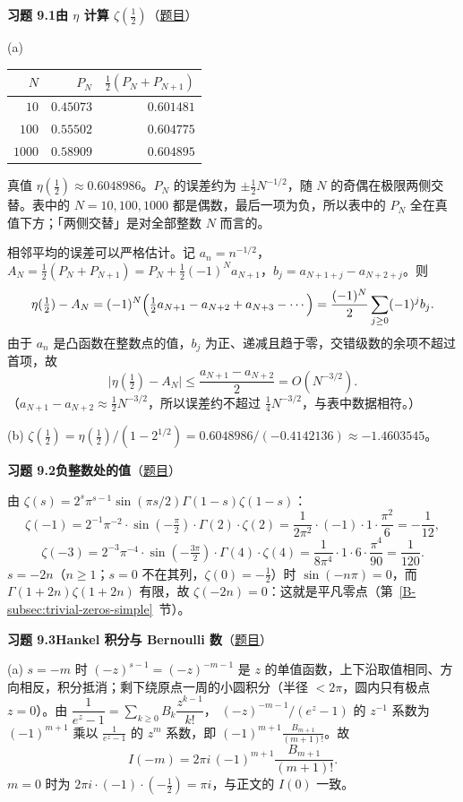 \documentclass[11pt,a4paper]{article}
\newcommand{\bref}[1]{\ref*{B-#1}}
\newcommand{\Sol}[2]{%
  \par\addvspace{1.2em}\noindent
  \hypertarget{s:#1}{}\textbf{习题 #1\quad #2}\hfill{\small（\hyperlink{q:#1}{题目}）}\par
  \nopagebreak\smallskip}
\begin{document}
\Sol{9.1}{由 $\eta$ 计算 $\zeta(\tfrac12)$}
(a)
\begin{center}
\begin{tabular}{rrr}
\toprule
$N$ & $P_N$ & $\tfrac12(P_N+P_{N+1})$\\
\midrule
$10$ & $0.45073$ & $0.601481$\\
$100$ & $0.55502$ & $0.604775$\\
$1000$ & $0.58909$ & $0.604895$\\
\bottomrule
\end{tabular}
\end{center}
真值 $\eta(\tfrac12)\approx0.6048986$。$P_N$ 的误差约为 $\pm\tfrac12N^{-1/2}$，随 $N$ 的奇偶在极限两侧交替。表中的 $N=10,100,1000$ 都是偶数，最后一项为负，所以表中的 $P_N$ 全在真值下方；「两侧交替」是对全部整数 $N$ 而言的。

相邻平均的误差可以严格估计。记 $a_n=n^{-1/2}$，$A_N=\frac12(P_N+P_{N+1})=P_N+\frac12(-1)^Na_{N+1}$，$b_j=a_{N+1+j}-a_{N+2+j}$。则
\[
  \eta(\tfrac12)-A_N=(-1)^N\Bigl(\tfrac12a_{N+1}-a_{N+2}+a_{N+3}-\cdots\Bigr)
  =\frac{(-1)^N}2\sum_{j\ge0}(-1)^jb_j .
\]
由于 $a_n$ 是凸函数在整数点的值，$b_j$ 为正、递减且趋于零，交错级数的余项不超过首项，故
\[
  \bigl|\eta(\tfrac12)-A_N\bigr|\le\frac{a_{N+1}-a_{N+2}}2=O(N^{-3/2}).
\]
（$a_{N+1}-a_{N+2}\approx\frac12N^{-3/2}$，所以误差约不超过 $\frac14N^{-3/2}$，与表中数据相符。）

(b) $\zeta(\tfrac12)=\eta(\tfrac12)/(1-2^{1/2})=0.6048986/(-0.4142136)\approx-1.4603545$。

\Sol{9.2}{负整数处的值}
由 $\zeta(s)=2^s\pi^{s-1}\sin(\pi s/2)\Gamma(1-s)\zeta(1-s)$：
\[
  \zeta(-1)=2^{-1}\pi^{-2}\cdot\sin(-\tfrac\pi2)\cdot\Gamma(2)\cdot\zeta(2)=\frac1{2\pi^2}\cdot(-1)\cdot1\cdot\frac{\pi^2}6=-\frac1{12},
\]
\[
  \zeta(-3)=2^{-3}\pi^{-4}\cdot\sin(-\tfrac{3\pi}2)\cdot\Gamma(4)\cdot\zeta(4)=\frac1{8\pi^4}\cdot1\cdot6\cdot\frac{\pi^4}{90}=\frac1{120}.
\]
$s=-2n$（$n\ge1$；$s=0$ 不在其列，$\zeta(0)=-\frac12$）时 $\sin(-n\pi)=0$，而 $\Gamma(1+2n)\zeta(1+2n)$ 有限，故 $\zeta(-2n)=0$：这就是平凡零点（第~\bref{subsec:trivial-zeros-simple}~节）。

\Sol{9.3}{Hankel 积分与 Bernoulli 数}
(a) $s=-m$ 时 $(-z)^{s-1}=(-z)^{-m-1}$ 是 $z$ 的单值函数，上下沿取值相同、方向相反，积分抵消；剩下绕原点一周的小圆积分（半径 $<2\pi$，圆内只有极点 $z=0$）。由
$\dfrac1{e^z-1}=\sum_{k\ge0}B_k\dfrac{z^{k-1}}{k!}$，
$(-z)^{-m-1}/(e^z-1)$ 的 $z^{-1}$ 系数为 $(-1)^{m+1}$ 乘以 $\frac1{e^z-1}$ 的 $z^m$ 系数，即 $(-1)^{m+1}\frac{B_{m+1}}{(m+1)!}$。故
\[
  I(-m)=2\pi i\,(-1)^{m+1}\frac{B_{m+1}}{(m+1)!}.
\]
$m=0$ 时为 $2\pi i\cdot(-1)\cdot(-\tfrac12)=\pi i$，与正文的 $I(0)$ 一致。
\end{document}
